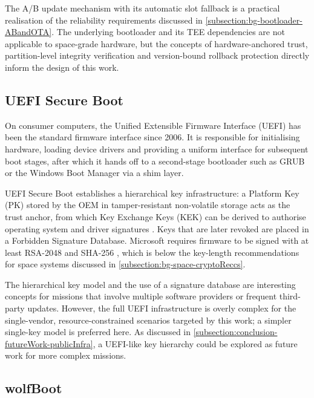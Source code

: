 The A/B update mechanism \cite{android_ota_updating_2026} with its automatic slot fallback is a practical realisation of the reliability requirements discussed in \autoref{subsection:bg-bootloader-ABandOTA}. The underlying bootloader and its TEE dependencies are not applicable to space-grade hardware, but the concepts of hardware-anchored trust, partition-level integrity verification and version-bound rollback protection directly inform the design of this work.

\subsection{UEFI Secure Boot}
\label{subsection:related-existing-uefi}

On consumer computers, the Unified Extensible Firmware Interface (UEFI) \cite{UEFI} has been the standard firmware interface since 2006. It is responsible for initialising hardware, loading device drivers and providing a uniform interface for subsequent boot stages, after which it hands off to a second-stage bootloader such as GRUB or the Windows Boot Manager via a shim layer.

UEFI Secure Boot establishes a hierarchical key infrastructure: a Platform Key (PK) stored by the OEM in tamper-resistant non-volatile storage acts as the trust anchor, from which Key Exchange Keys (KEK) can be derived to authorise operating system and driver signatures \cite{UEFI_Secure_Boot_Microsoft}. Keys that are later revoked are placed in a Forbidden Signature Database. Microsoft requires firmware to be signed with at least RSA-2048 and SHA-256 \cite{OEM_Secure_Boot_Microsoft}, which is below the key-length recommendations for space systems discussed in \autoref{subsection:bg-space-cryptoReccs}.

The hierarchical key model and the use of a signature database are interesting concepts for missions that involve multiple software providers or frequent third-party updates. However, the full UEFI infrastructure is overly complex for the single-vendor, resource-constrained scenarios targeted by this work; a simpler single-key model is preferred here. As discussed in \autoref{subsection:conclusion-futureWork-publicInfra}, a UEFI-like key hierarchy could be explored as future work for more complex missions.

\subsection{wolfBoot}
\label{subsection:related-existing-wolfBoot}

